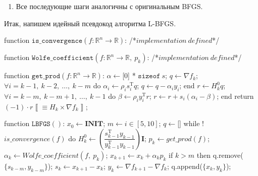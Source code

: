 \documentclass[12pt, a4paper, oneside, final]{article}
\begin{document}
\begin{enumerate}[1)]
		Из всего вышеописанного мы можем провести произведение $H_{k} \times \nabla{f_{k}}$ более эффективно следующим образом
		\begin{lstlisting}
$\alpha \gets$[0] * $\texttt{sizeof}~s$;
$q \gets \nabla{f_{k}}$;
$\forall i = k - 1, ~ k - 2, ~ \ldots, ~ k - m$ do
	$\alpha_{i} \gets \rho_{i}s_{i}^{\mathrm{T}}q$;
	$q \gets q - \alpha_{i}y_{i}$;
end
$r \gets H_{k}^{0}q$;
$\forall i = k - m, ~ k - m + 1, ~ \ldots, ~ k - 1$ do
	$\beta \gets \rho_{i}y_{i}^{\mathrm{T}}r$;
	$r \gets r + s_i(\alpha_i - \beta)$;
end
return $(-1) \cdot r \left\llbracket\equiv H_k \times \nabla{f_{k}}\right\rrbracket$;
		\end{lstlisting}
		Получение нового на данной итерации $H_{k}^{0}$ мы также сильно ускорим, лишь приблизив наши значения, используя формулу $H_{k}^{0} = \gamma_{k}\mathbf{I}$, где
		\[
			\gamma_{k} = \dfrac{s_{k - 1}^{\mathrm{T}}y_{k - 1}}{y_{k - 1}^{\mathrm{T}}y_{k - 1}}
		\]
		\item Все последующие шаги аналогичны с оригинальным BFGS.
	\end{enumerate}
	Итак, напишем идейный псевдокод алгоритма L-BFGS.
	\begin{pseudocode}
function $\mathtt{is\_convergence}(f : \mathbb{R}^{n} \to \mathbb{R})$:
	/*$implementation~defined$*/

function $\mathtt{Wolfe\_coefficient}(f : \mathbb{R}^{n} \to \mathbb{R}, ~ p_{k})$:
	/*$implementation~defined$*/

function $\mathtt{get\_prod}(f : \mathbb{R}^{n} \to \mathbb{R})$:
	$\alpha \gets$[0] * $\texttt{sizeof}~s$;
	$q \gets \nabla{f_{k}}$;
	$\forall i = k - 1, ~ k - 2, ~ \ldots, ~ k - m$ do
		$\alpha_{i} \gets \rho_{i}s_{i}^{\mathrm{T}}q$;
		$q \gets q - \alpha_{i}y_{i}$;
	end
	$r \gets H_{k}^{0}q$;
	$\forall i = k - m, ~ k - m + 1, ~ \ldots, ~ k - 1$ do
		$\beta \gets \rho_{i}y_{i}^{\mathrm{T}}r$;
		$r \gets r + s_i(\alpha_i - \beta)$;
	end
	return $(-1) \cdot r \left\llbracket\equiv H_k \times \nabla{f_{k}}\right\rrbracket$;
	
function $\mathtt{LBFGS}()$:
	$x_{0} \gets \mathbf{INIT}$;
	$m \gets i \in [5, 10]$;
	$q \gets$[]
	while !$is\_convergence(f)$ do
		$H_{k}^{0} \gets \left(\dfrac{s_{k - 1}^{\mathrm{T}}y_{k - 1}}{y_{k - 1}^{\mathrm{T}}y_{k - 1}}\right)\mathbf{I}$;
		$p_{k} \gets get\_prod(f)$;
		$\alpha_{k} \gets Wolfe\_coefficient(f, ~ p_{k})$;
		$x_{k + 1} \gets x_{k} + \alpha_{k}p_{k}$
		if $k > m$ then
			q.remove($\{s_{k - m}, y_{k - m}\}$);
		$s_{k} \gets x_{k + 1} - x_{k}$;
		$y_{k} \gets \nabla{f_{k + 1}} - \nabla{f_{k}}$;
		q.append($\{x_{k}, y_{k}\}$);
	\end{pseudocode}
\end{document}
